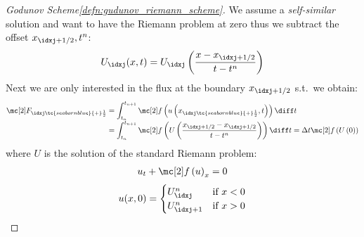 \begin{proofbox}\nospacing
    \begin{proof}[Godunov Scheme\cref{defn:gudunov_riemann_scheme}]\label{proof:gudonov_scheme}
        We assume a \textit{self-similar} solution and want to have the Riemann problem at zero thus we subtract the offset $x_{\idxj+1/2}, t^{n}$:
        \begin{align}
          U_{\idxj}(x,t)=U_{\idxj}\left(\frac{x-x_{\idxj+1/2}}{t-t^{n}}\right)
        \end{align}
        Next we are only interested in the flux at the boundary $x_{\idxj+1/2}$ s.t.\ we obtain:
        \begin{align*}
          \Flux_{\idxj\tc{seabornblue}{+}\frac{1}{2}}
          &=\int_{t_{n}}^{t_{n+1}}\flux \left(u\left(x_{\idxj\tc{seabornblue}{+}\frac{1}{2}},t\right)\right)\diff t \\[-1\jot]
            &=\int_{t_{n}}^{t_{n+1}}\flux \left(U\left(\frac{x_{\idxj+1/2}-x_{\idxj+1/2}}{t-t^{n}}\right)\right)\diff t
            =\Delta t \flux \left(U\left(0\right)\right)
        \end{align*}
        where $U$ is the solution of the standard Riemann problem:
        \begin{align}
        u_{t}+\flux \left(u\right)_{x}=0
        \end{align}
        \begin{align}
            u(x,0)=\begin{cases}
                    U_{\idxj}^{n}&\text{if }x<0\\
                    U_{\idxj+1}^{n}&\text{if }x>0
                    \end{cases}
        \label{eq:riemann_problem}
        \end{align}
    \end{proof}
\end{proofbox}

